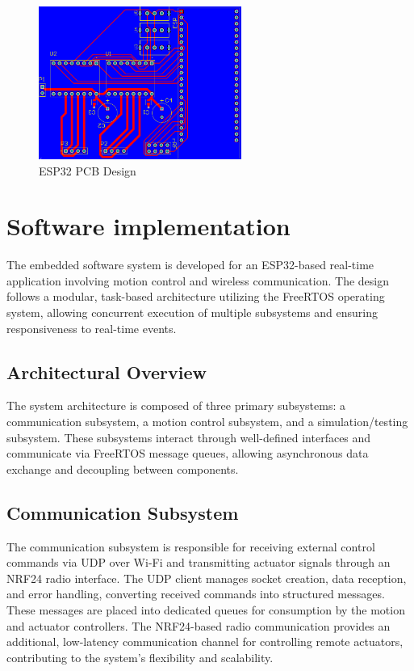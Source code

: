 \begin{figure}[h]
	\centering\includegraphics[height=5cm]{./images/ESP32_pcb}
	\caption{ESP32 PCB Design}
	\label{fig:esp-pcb}
\end{figure}


\section{Software implementation}

The embedded software system is developed for an ESP32-based real-time application involving motion control and wireless communication. The design follows a modular, task-based architecture utilizing the FreeRTOS operating system, allowing concurrent execution of multiple subsystems and ensuring responsiveness to real-time events.

\subsection{Architectural Overview}
The system architecture is composed of three primary subsystems: a communication subsystem, a motion control subsystem, and a simulation/testing subsystem. These subsystems interact through well-defined interfaces and communicate via FreeRTOS message queues, allowing asynchronous data exchange and decoupling between components.

\subsection{Communication Subsystem}
The communication subsystem is responsible for receiving external control commands via UDP over Wi-Fi and transmitting actuator signals through an NRF24 radio interface. The UDP client manages socket creation, data reception, and error handling, converting received commands into structured messages. These messages are placed into dedicated queues for consumption by the motion and actuator controllers. The NRF24-based radio communication provides an additional, low-latency communication channel for controlling remote actuators, contributing to the system's flexibility and scalability.

